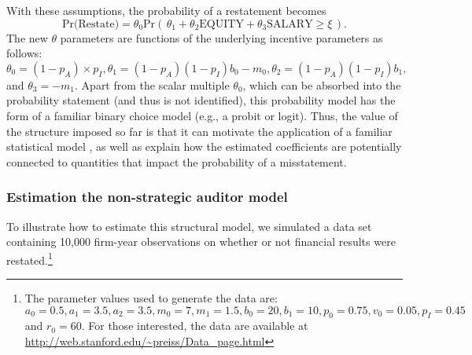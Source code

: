 \documentclass[12pt,reqno,titlepage]{amsart}
\theoremstyle{definition}
\begin{document}
\begin{doublespace}
With these assumptions, the probability of a restatement becomes
\begin{equation} \label{restate1}
\mbox{Pr(Restate)} = \theta_0 \mbox{Pr}\left(\, \theta_1 + \theta_2 \mbox{EQUITY} + \theta_3 \mbox{SALARY}  \ge \xi \,\right) .
\end{equation}
The new $\theta$ parameters are functions of the underlying incentive parameters as
follows: $\theta_0=(1-p_A) \times p_I, \theta_1 = (1 - p_A)(1 - p_I) b_0 - m_0, 
\theta_2 = (1 - p_A)(1 - p_I) b_1,$ and $\theta_3 = - m_1$. 
Apart from the scalar multiple $\theta_0$, which can be absorbed into the probability statement (and thus is not identified), this probability model has the form of  a familiar binary choice  model (e.g., a probit or logit).
Thus, the value of the structure imposed so far is that it can motivate the application of a familiar statistical model \citep[as in][]{Efendi:2007ja}, as well as explain how the estimated coefficients are potentially connected to quantities that impact the probability of a misstatement.


\subsubsection{Estimation the non-strategic auditor model}

To illustrate how to estimate this structural model, we simulated a data set containing 10,000 firm-year observations on whether or not financial results were restated.\footnote{The parameter values used to generate the data are: $a_0 = 0.5 , a_1 = 3.5 , a_2 = 3.5,
m_0 = 7, m_1 = 1.5, b_0 = 20, b_1 = 10, p_0 =0.75,
v_0 = 0.05, p_I = 0.45$ and $r_0 = 60$.
For those interested, the data are available at \url{http://web.stanford.edu/~preiss/Data_page.html}}


\end{doublespace}
\end{document}
